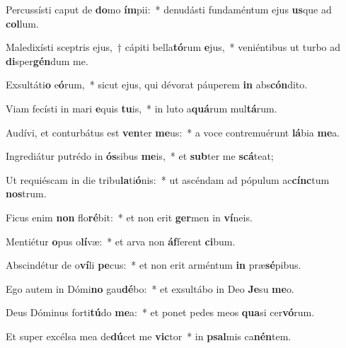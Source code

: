 \item Percussísti caput de \textbf{do}mo \textbf{ím}pii:~* denudásti fundaméntum ejus \textbf{us}que ad \textbf{col}lum.
\item Maledixísti sceptris ejus,~† cápiti bella\textbf{tó}rum \textbf{e}jus,~* veniéntibus ut turbo ad \textbf{di}sper\textbf{gén}dum me.
\item Exsultáti\textbf{o} e\textbf{ó}rum,~* sicut ejus, qui dévorat páuperem \textbf{in} abs\textbf{cón}dito.
\item Viam fecísti in mari \textbf{e}quis \textbf{tu}is,~* in luto a\textbf{quá}rum mul\textbf{tá}rum.
\item Audívi, et conturbátus est \textbf{ven}ter \textbf{me}us:~* a voce contremuérunt \textbf{lá}bia \textbf{me}a.
\item Ingrediátur putrédo in \textbf{ós}sibus \textbf{me}is,~* et \textbf{sub}ter me \textbf{scá}teat;
\item Ut requiéscam in die tribu\textbf{la}ti\textbf{ó}nis:~* ut ascéndam ad pópulum ac\textbf{cínc}tum \textbf{nos}trum.
\item Ficus enim \textbf{non} flo\textbf{ré}bit:~* et non erit \textbf{ger}men in \textbf{ví}neis.
\item Mentiétur \textbf{o}pus o\textbf{lí}væ:~* et arva non \textbf{áf}ferent \textbf{ci}bum.
\item Abscindétur de o\textbf{ví}li \textbf{pe}cus:~* et non erit arméntum \textbf{in} præ\textbf{sé}pibus.
\item Ego autem in Dómi\textbf{no} gau\textbf{dé}bo:~* et exsultábo in Deo \textbf{Je}su \textbf{me}o.
\item Deus Dóminus forti\textbf{tú}do \textbf{me}a:~* et ponet pedes meos \textbf{qua}si cer\textbf{vó}rum.
\item Et super excélsa mea de\textbf{dú}cet me \textbf{vic}tor~* in \textbf{psal}mis ca\textbf{nén}tem.
